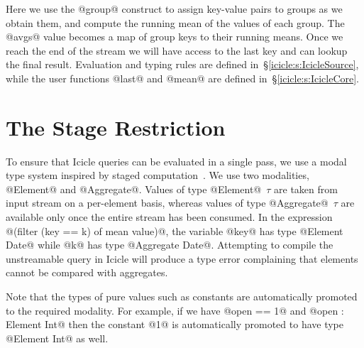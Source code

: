 Here we use the @group@ construct to assign key-value pairs to groups as we obtain them, and compute the running mean of the values of each group. The @avgs@ value becomes a map of group keys to their running means. Once we reach the end of the stream we will have access to the last key and can lookup the final result.
Evaluation and typing rules are defined in~\S\ref{icicle:s:IcicleSource}, while the user functions @last@ and @mean@ are defined in~\S\ref{icicle:s:IcicleCore}.


\section{The Stage Restriction}
To ensure that Icicle queries can be evaluated in a single pass, we use a modal type system inspired by staged computation~\cite{davies2001modal}. We use two modalities, @Element@ and @Aggregate@. Values of type @Element@~$\tau$ are taken from input stream on a per-element basis, whereas values of type @Aggregate@~$\tau$ are available only once the entire stream has been consumed. In the expression @(filter (key == k) of mean value)@, the variable @key@ has type @Element Date@ while @k@ has type @Aggregate Date@. Attempting to compile the unstreamable query in Icicle will produce a type error complaining that elements cannot be compared with aggregates.

Note that the types of pure values such as constants are automatically promoted to the required modality. For example, if we have @open == 1@ and @open : Element Int@ then the constant @1@ is automatically promoted to have type @Element Int@ as well.


